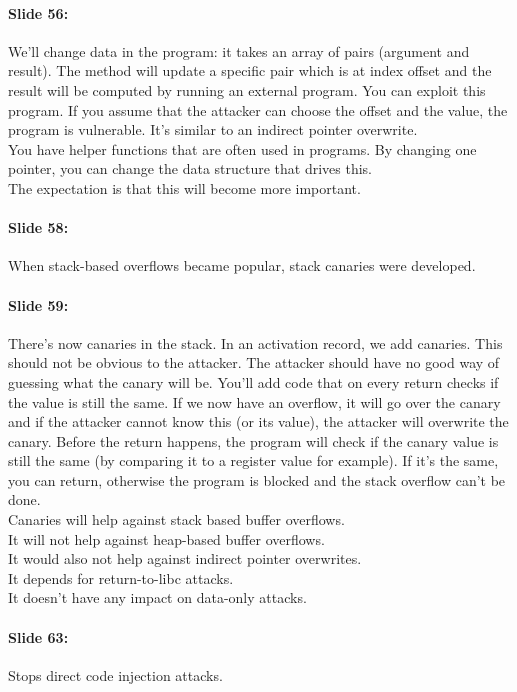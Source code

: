 \documentclass[10pt,a4paper]{report}
\begin{document}
\paragraph{Slide 56:} We'll change data in the program: it takes an array of pairs (argument and result). The method will update a specific pair which is at index offset and the result will be computed by running an external program. You can exploit this program. If you assume that the attacker can choose the offset and the value, the program is vulnerable. It's similar to an indirect pointer overwrite.\\
You have helper functions that are often used in programs. By changing one pointer, you can change the data structure that drives this.\\
The expectation is that this will become more important.

\paragraph{Slide 58:} When stack-based overflows became popular, stack canaries were developed.

\paragraph{Slide 59:} There's now canaries in the stack. In an activation record, we add canaries. This should not be obvious to the attacker. The attacker should have no good way of guessing what the canary will be. You'll add code that on every return checks if the value is still the same. If we now have an overflow, it will go over the canary and if the attacker cannot know this (or its value), the attacker will overwrite the canary. Before the return happens, the program will check if the canary value is still the same (by comparing it to a register value for example). If it's the same, you can return, otherwise the program is blocked and the stack overflow can't be done.\\
Canaries will help against stack based buffer overflows.\\
It will not help against heap-based buffer overflows. \\
It would also not help against indirect pointer overwrites. \\
It depends for return-to-libc attacks. \\
It doesn't have any impact on data-only attacks.

\paragraph{Slide 63:} Stops direct code injection attacks. 
\end{document}

